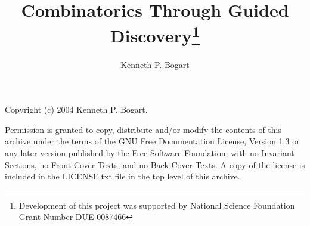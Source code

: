 \documentclass[12 pt]{book}
\title{Combinatorics Through Guided Discovery\thanks{Development of this 
project was supported by National Science Foundation Grant Number
DUE-0087466}}
\author{Kenneth P. Bogart}
\begin{document}
\frontmatter
\maketitle
\vspace*{\fill}
Copyright (c) 2004 Kenneth P. Bogart.  

Permission is granted to copy, distribute and/or modify the contents
of this archive under the terms of the GNU Free Documentation License,
Version 1.3 or any later version published by the Free Software
Foundation; with no Invariant Sections, no Front-Cover Texts, and no
Back-Cover Texts.  A copy of the license is included in the
LICENSE.txt file in the top level of this archive.

\tableofcontents

%


\mainmatter




 





\backmatter
\printindex
\end{document}
